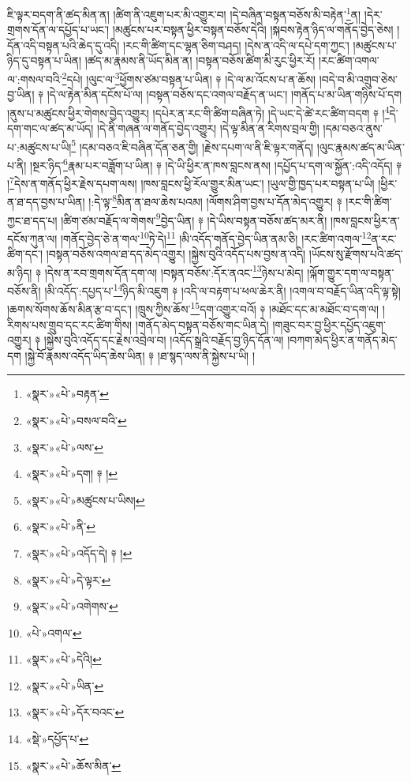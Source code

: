 ཇི་ལྟར་བདག་ནི་ཚད་མིན་ན། །ཚིག་ནི་འཇུག་པར་མི་འགྱུར་བ། །དེ་བཞིན་བསྟན་བཅོས་མི་བརྟེན་\footnote{«སྣར་»«པེ་»བརྟན་}ན། །དེར་གྲགས་དོན་ལ་དཔྱོད་པ་ཡང་། །མཚུངས་པར་བསྟན་ཕྱིར་བསྟན་བཅོས་དེའི། །སྐབས་རྟེན་ཉིད་ལ་གནོད་བྱེད་ཅེས། །དོན་འདི་བསྟན་པའི་ཆེད་དུ་འདི། །རང་གི་ཚིག་དང་ལྷན་ཅིག་བཤད། །དེས་ན་འདི་ལ་དཔེ་དག་ཀྱང་། །མཚུངས་པ་ཉིད་དུ་བསྟན་པ་ཡིན། །ཚད་མ་རྣམས་ནི་ཡོད་མིན་ན། །བསྟན་བཅོས་ཚིག་མི་རུང་ཕྱིར་རོ། །རང་ཚིག་འགལ་ལ་:གསལ་བའི་\footnote{«སྣར་»«པེ་»བསལ་བའི་}དཔེ། །ལུང་ལ་\footnote{«སྣར་»«པེ་»ལས་}ཕྱོགས་ཙམ་བསྟན་པ་ཡིན། ༈ །དེ་ལ་མ་འོངས་པ་ན་ཆོས། །བདེ་བ་མི་འགྲུབ་ཅེས་བྱ་ཡིན། ༈ །དེ་ལ་རྟེན་མིན་དངོས་པོ་ལ། །བསྟན་བཅོས་དང་འགལ་བརྗོད་ན་ཡང་། །གནོད་པ་མ་ཡིན་གཉིས་པོ་དག །ནུས་པ་མཚུངས་ཕྱིར་གེགས་བྱེད་འགྱུར། །དཔེར་ན་རང་གི་ཚིག་བཞིན་ཏེ། །དེ་ཡང་དེ་ཚེ་རང་ཚིག་བདག ༈ །\footnote{«སྣར་»«པེ་»དག། ༈ །}དེ་དག་གང་ལ་ཚད་མ་ཡོད། །དེ་ནི་གཞན་ལ་གནོད་བྱེད་འགྱུར། །དེ་ལྟ་མིན་ན་རིགས་བྲལ་གྱི། །དམ་བཅའ་ནུས་པ་:མཚུངས་པ་ཡི།\footnote{«སྣར་»«པེ་»མཚུངས་པ་ཡིས།} །དམ་བཅའ་ཇི་བཞིན་དོན་ཅན་གྱི། །རྗེས་དཔག་ལ་ནི་ཇི་ལྟར་གནོད། །ལུང་རྣམས་ཚད་མ་ཡིན་པ་ནི། །སྔར་ཉིད་\footnote{«སྣར་»«པེ་»ནི་}རྣམ་པར་བཟློག་པ་ཡིན། ༈ །དེ་ཡི་ཕྱིར་ན་ཁས་བླངས་ནས། །དཔྱོད་པ་དག་ལ་སྐྱོན་:འདི་འདོད། ༈ །\footnote{«སྣར་»«པེ་»འདོད་དེ། ༈ །}དེས་ན་གནོད་ཕྱིར་རྗེས་དཔག་ལས། །ཁས་བླངས་ཕྱི་རོལ་གྱུར་མིན་ཡང་། །ཡུལ་གྱི་ཁྱད་པར་བསྟན་པ་ཡི། །ཕྱིར་ན་ཐ་དད་བྱས་པ་ཡིན། །:དེ་ལྟ་\footnote{«སྣར་»«པེ་»དེ་ལྟར་}མིན་ན་ཐལ་ཆེས་པའམ། །ལོགས་ཤིག་བྱས་པ་དོན་མེད་འགྱུར། ༈ །རང་གི་ཚིག་ཀྱང་ཐ་དད་པ། །ཚིག་ཙམ་བརྗོད་ལ་གེགས་\footnote{«སྣར་»«པེ་»འགེགས་}བྱེད་ཡིན། ༈ །དེ་ཡིས་བསྟན་བཅོས་ཚད་མར་ནི། །ཁས་བླངས་ཕྱིར་ན་དངོས་ཀུན་ལ། །གནོད་བྱེད་ཅེ་ན་གལ་\footnote{«པེ་»འགལ་}ཏེ་དེ།\footnote{«སྣར་»«པེ་»དེའི།} །མི་འདོད་གནོད་བྱེད་ཡིན་ནམ་ཅི། །རང་ཚིག་འགལ་\footnote{«སྣར་»«པེ་»ཡིན་}ན་རང་ཚིག་དང་། །བསྟན་བཅོས་འགལ་ཐ་དད་མེད་འགྱུར། །སྐྱེས་བུའི་འདོད་པས་བྱས་ན་འདི། །ཡོངས་སུ་རྫོགས་པའི་ཚད་མ་ཉིད། ༈ །དེས་ན་རབ་གྲགས་དོན་དག་ལ། །བསྟན་བཅོས་:དོར་ནའང་\footnote{«སྣར་»«པེ་»དོར་བའང་}ཉེས་པ་མེད། །ལྐོག་གྱུར་དག་ལ་བསྟན་བཅོས་ནི། །མི་འདོད་:དཔྱད་པ་\footnote{«སྡེ་»དཔྱོད་པ་}ཉིད་མི་འཇུག ༈ །འདི་ལ་བརྟག་པ་ཕལ་ཆེར་ནི། །འགལ་བ་བརྗོད་ཡིན་འདི་ལྟ་སྟེ། །ཆགས་སོགས་ཆོས་མིན་རྩ་བ་དང་། །ཁྲུས་ཀྱིས་ཆོས་\footnote{«སྣར་»«པེ་»ཆོས་མིན་}དག་འགྱུར་བའོ། ༈ །མཐོང་དང་མ་མཐོང་བ་དག་ལ། །རིགས་པས་གྲུབ་དང་རང་ཚིག་གིས། །གནོད་མེད་བསྟན་བཅོས་གང་ཡིན་དེ། །གཟུང་བར་བྱ་ཕྱིར་དཔྱོད་འཇུག་འགྱུར། ༈ །སྐྱེས་བུའི་འདོད་དང་རྗེས་འབྲེལ་བ། །འདོད་སྒྲའི་བརྗོད་བྱ་ཉིད་དོན་ལ། །བཀག་མེད་ཕྱིར་ན་གནོད་མེད་དག །སྐྱེ་བོ་རྣམས་འདོད་ཡིད་ཆེས་ཡིན། ༈ །ཐ་སྙད་ལས་ནི་སྐྱེས་པ་ཡི། །
